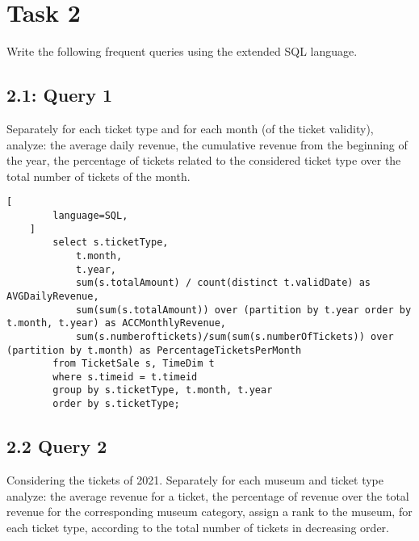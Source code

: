 \section{Task 2}

\begin{question}
    Write the following frequent queries using the extended SQL language.
\end{question}

\subsection{2.1: Query 1}

\begin{question}
    Separately for each ticket type and for each month (of the ticket validity),
    analyze: the average daily revenue, the cumulative revenue from the beginning of
    the year, the percentage of tickets related to the considered ticket type over the
    total number of tickets of the month.
\end{question}

\begin{answer}
    \begin{lstlisting}[
        language=SQL,
    ]
        select s.ticketType,
            t.month,
            t.year,
            sum(s.totalAmount) / count(distinct t.validDate) as AVGDailyRevenue,
            sum(sum(s.totalAmount)) over (partition by t.year order by t.month, t.year) as ACCMonthlyRevenue,
            sum(s.numberoftickets)/sum(sum(s.numberOfTickets)) over (partition by t.month) as PercentageTicketsPerMonth
        from TicketSale s, TimeDim t
        where s.timeid = t.timeid
        group by s.ticketType, t.month, t.year
        order by s.ticketType;
    \end{lstlisting}

\end{answer}

\subsection{2.2 Query 2}

\begin{question}
    Considering the tickets of 2021. Separately for each museum and ticket type
    analyze: the average revenue for a ticket, the percentage of revenue over the total
    revenue for the corresponding museum category, assign a rank to the museum, for
    each ticket type, according to the total number of tickets in decreasing order.

\end{question}

